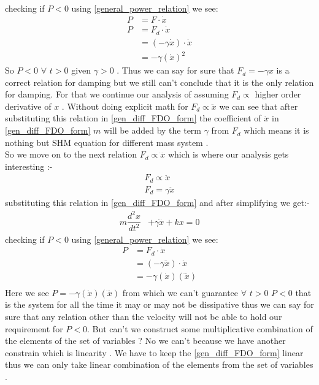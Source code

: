 \documentclass[10pt,twoside]{report}
\begin{document}
checking if $P <0 $ using \eqref{general_power_relation} we see:
\begin{align*}
    P &= F \cdot \dot{x} \\
    P &= F_d \cdot \dot{x}\\
      &= (-\gamma \dot{x}) \cdot \dot{x}\\
      &= -\gamma (\dot{x})^2
\end{align*}
So $P <0$ $\forall$ $t > 0$ given $\gamma >0 $ . Thus we can say for sure that $ F_d = -\gamma x$ is a correct relation for damping but we still can't conclude that it is the only relation for damping. For that we continue our analysis of assuming $F_d \propto$ higher order derivative of $x$ . Without doing explicit math for $F_d \propto \ddot{x}$ we can see that after substituting this relation in \eqref{gen_diff_FDO_form} the coefficient of $\ddot{x}$ in \eqref{gen_diff_FDO_form} $m$ will be added by the term $\gamma$ from $F_d$ which means it is nothing but SHM equation for different mass system .\\ So we move on to the next relation $F_d \propto \dddot{x}$ which is where our analysis gets interesting :-
\begin{align*}
    F_d \propto \ddot{x}\\
    F_d =\gamma \ddot{x}
\end{align*}
substituting this relation in \eqref{gen_diff_FDO_form} and after simplifying we get:-
\begin{align*}
    m \dfrac{d^2x}{dt^2} &+ \gamma \dddot{x} + kx  = 0
\end{align*}
checking if $P <0 $ using \eqref{general_power_relation} we see:
\begin{align*}
    P &= F_d \cdot \dot{x}\\
      &= (-\gamma \dddot{x}) \cdot \dot{x}\\
      &= -\gamma (\dot{x}) (\dddot{x})\\
\end{align*}
Here we see $ P = -\gamma (\dot{x}) (\dddot{x}) $ from which we can't guarantee  $\forall$ $t>0$ $P<0$ that is the system for all the time it may or may not be dissipative thus we can say for sure that any relation other than the velocity will not be able to hold our requirement for $P<0$.
But can't we construct some multiplicative combination of the elements of the set of variables ? No we can't because we have another constrain which is linearity . We have to keep the \eqref{gen_diff_FDO_form} linear thus we can only take linear combination of the elements from the set of variables . 
\end{document}

